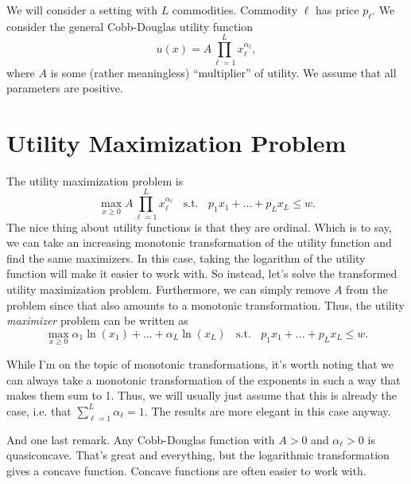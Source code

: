 \documentclass[12pt]{article}
\theoremstyle{definition}
\begin{document}
\maketitle
\onehalfspace


We will consider a setting with $L$ commodities. Commodity $\ell$ has price $p_{\ell}$. We consider the general Cobb-Douglas utility function
	\[	u(x)=A \prod_{{\ell}=1}^L x_{\ell}^{\alpha_{\ell}},\]
where $A$ is some (rather meaningless) ``multiplier'' of utility. We assume that all parameters are positive.



\section{Utility Maximization Problem}
The utility maximization problem is 
	\[	\max_{x \geq 0} A \prod_{{\ell}=1}^L x_{\ell}^{\alpha_{\ell}}  \;\; \text{ s.t. } \;\;  p_1x_1 + ... + p_Lx_L \leq w. \]		
The nice thing about utility functions is that they are ordinal. Which is to say, we can take an increasing monotonic transformation of the utility function and find the same maximizers. In this case, taking the logarithm of the utility function will make it easier to work with. So instead, let's solve the transformed utility maximization problem. Furthermore, we can simply remove $A$ from the problem since that also amounts to a monotonic transformation. Thus, the utility \emph{maximizer} problem can be written as
	\[	\max_{x \geq 0} \alpha_1\ln(x_1) + ... + \alpha_L\ln(x_L)  \;\; \text{ s.t. } \;\;  p_1x_1 + ... + p_Lx_L \leq w. \]

While I'm on the topic of monotonic transformations, it's worth noting that we can always take a monotonic transformation of the exponents in such a way that makes them sum to 1. Thus, we will usually just assume that this is already the case, i.e. that $\sum_{\ell=1}^L\alpha_{\ell} =1$. The results are more elegant in this case anyway.	

And one last remark. Any Cobb-Douglas function with $A>0$ and $\alpha_{\ell}>0$ is quasiconcave. That's great and everything, but the logarithmic transformation gives a concave function. Concave functions are often easier to work with. 

    
\end{document}
